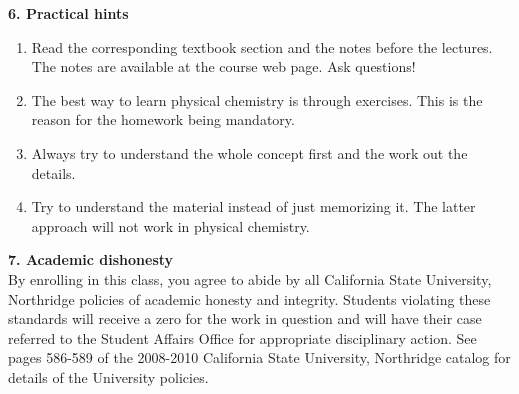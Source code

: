\documentclass{report}
\begin{document}
\textbf{6. Practical hints}

\begin{enumerate}
\item Read the corresponding textbook section and the notes before the lectures. The notes are available at the course web page. Ask questions!
\item The best way to learn physical chemistry is through exercises. This is the reason for the homework being mandatory.
\item Always try to understand the whole concept first and the work out the details.
\item Try to understand the material instead of just memorizing it. The latter approach will not work in physical chemistry.
\end{enumerate}

\vspace*{0.2cm}

\textbf{7. Academic dishonesty}\\

By enrolling in this class, you agree to abide by all California State University, Northridge policies of academic honesty and integrity. Students violating these standards will receive a zero for the work in question and will have their case referred to the Student Affairs Office for appropriate disciplinary action. See pages 586-589 of the 2008-2010 California State University, Northridge catalog for details of the University policies.
\end{document}
